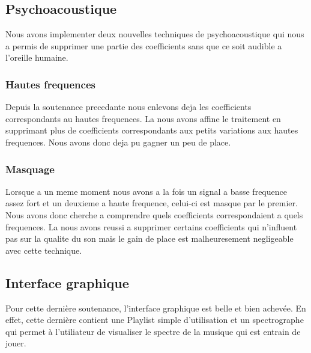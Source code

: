 \documentclass[a4paper,12pt]{report}
\begin{document}
\subsection{Psychoacoustique}
Nous avons implementer deux nouvelles techniques de psychoacoustique
qui nous a permis de supprimer une partie des coefficients sans que ce
soit audible a l'oreille humaine.
\subsubsection{Hautes frequences}
Depuis la soutenance precedante nous enlevons deja les coefficients
correspondants au hautes frequences. La nous avons affine le
traitement en supprimant plus de coefficients correspondants aux
petits variations aux hautes frequences. Nous avons donc deja pu
gagner un peu de place.
\subsubsection{Masquage}
Lorsque a un meme moment nous avons a la fois un signal a basse
frequence assez fort et un deuxieme a haute frequence, celui-ci est
masque par le premier. Nous avons donc cherche a comprendre quels
coefficients correspondaient a quels frequences. La nous avons reussi
a supprimer certains coefficients qui n'influent pas sur la qualite du
son mais le gain de place est malheuresement negligeable avec cette technique.
\subsection{Interface graphique}
Pour cette dernière soutenance, l'interface graphique est belle et bien achevée.
En effet, cette dernière contient une Playlist simple d'utilisation et un
spectrographe qui permet à l'utiliateur de visualiser le spectre de la musique
qui est entrain de jouer.
\end{document}
